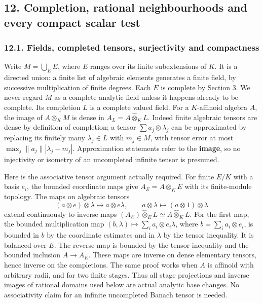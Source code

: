 \documentclass[
  11pt,
]{article}
\begin{document}
\subsection{12. Completion, rational neighbourhoods and every compact
scalar
test}\label{completion-rational-neighbourhoods-and-every-compact-scalar-test}

\subsubsection{12.1. Fields, completed tensors, surjectivity and
compactness}\label{fields-completed-tensors-surjectivity-and-compactness}

Write \(M=\bigcup_E E\), where \(E\) ranges over its finite
subextensions of \(K\). It is a directed union: a finite list of
algebraic elements generates a finite field, by successive
multiplication of finite degrees. Each \(E\) is complete by Section 3.
We never regard \(M\) as a complete analytic field unless it happens
already to be complete. Its completion \(L\) is a complete valued field.
For a \(K\)-affinoid algebra \(A\), the image of \(A\otimes_K M\) is
dense in \(A_L=A\widehat\otimes_K L\). Indeed finite algebraic tensors
are dense by definition of completion; a tensor
\(\sum a_j\otimes\lambda_j\) can be approximated by replacing its
finitely many \(\lambda_j\in L\) with \(m_j\in M\), with tensor error at
most \(\max_j\|a_j\||\lambda_j-m_j|\). Approximation statements refer to
the \textbf{image}, so no injectivity or isometry of an uncompleted
infinite tensor is presumed.

Here is the associative tensor argument actually required. For finite
\(E/K\) with a basis \(e_i\), the bounded coordinate maps give
\(A_E=A\otimes_K E\) with its finite-module topology. The maps on
algebraic tensors \[
 (a\otimes e)\otimes\lambda\mapsto a\otimes e\lambda,
 \qquad a\otimes\lambda\mapsto(a\otimes1)\otimes\lambda
                                                               \tag{30}
\] extend continuously to inverse maps
\((A_E)\widehat\otimes_E L\simeq A\widehat\otimes_K L\). For the first
map, the bounded multiplication map
\((b,\lambda)\mapsto\sum_i a_i\otimes e_i\lambda\), where
\(b=\sum_i a_i\otimes e_i\), is bounded in \(b\) by the coordinate
estimates and in \(\lambda\) by the tensor inequality. It is balanced
over \(E\). The reverse map is bounded by the tensor inequality and the
bounded inclusion \(A\to A_E\). These maps are inverse on dense
elementary tensors, hence inverse on the completions. The same proof
works when \(A\) is affinoid with arbitrary radii, and for two finite
stages. Thus all stage projections and inverse images of rational
domains used below are actual analytic base changes. No associativity
claim for an infinite uncompleted Banach tensor is needed.
\end{document}
